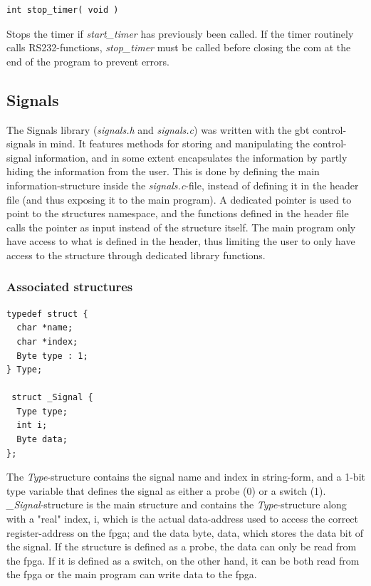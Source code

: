 \documentclass[main.tex]{subfiles}
\begin{document}
\begin{lstlisting}[frame=single] 
int stop_timer( void )
\end{lstlisting}
Stops the timer if \textit{start\_timer} has previously been called. If the timer routinely calls RS232-functions, \textit{stop\_timer} must be called before closing the \gls{com} at the end of the program to prevent errors.

\subsection{Signals}

The Signals library (\textit{signals.h} and \textit{signals.c}) was written with the \gls{gbt} control-signals in mind. It features methods for storing and manipulating the control-signal information, and in some extent encapsulates the information by partly hiding the information from the user. This is done by defining the main information-structure inside the \textit{signals.c}-file, instead of defining it in the header file (and thus exposing it to the main program). A dedicated pointer is used to point to the structures namespace, and the functions defined in the header file calls the pointer as input instead of the structure itself. The main program only have access to what is defined in the header, thus limiting the user to only have access to the structure through dedicated library functions.

\subsubsection{Associated structures}


\begin{lstlisting}[frame=single] 
typedef struct {
  char *name;
  char *index;
  Byte type : 1;
} Type;

 struct _Signal {
  Type type;
  int i; 
  Byte data; 
};
\end{lstlisting}

The \textit{Type}-structure contains the signal name and index in string-form, and a 1-bit type variable that defines the signal as either a probe (0) or a switch (1). \textit{\_Signal}-structure is the main structure and contains the \textit{Type}-structure along with a "real" index, i, which is the actual data-address used to access the correct register-address on the \gls{fpga}; and the data byte, data, which stores the data bit of the signal. If the structure is defined as a probe, the data can only be read from the \gls{fpga}. If it is defined as a switch, on the other hand, it can be both read from the \gls{fpga} or the main program can write data to the \gls{fpga}.
\end{document}
